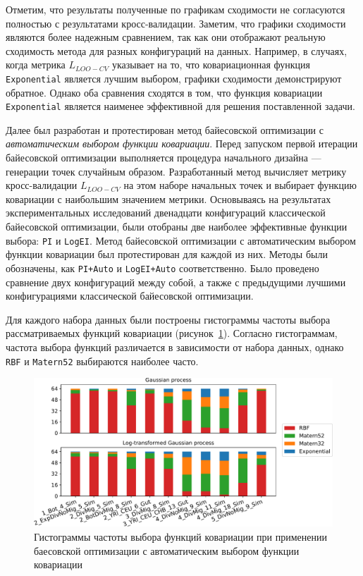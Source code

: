 Отметим, что результаты полученные по графикам сходимости не согласуются полностью с результатами кросс-валидации.
Заметим, что графики сходимости являются более надежным сравнением, так как они отображают реальную сходимость метода для разных конфигураций на данных.
Например, в случаях, когда метрика $L_{LOO-CV}$ указывает на то, что ковариационная функция \texttt{Exponential} является лучшим выбором, графики сходимости демонстрируют обратное.
Однако оба сравнения сходятся в том, что функция ковариации \texttt{Exponential} является наименее эффективной для решения поставленной задачи.

Далее был разработан и протестирован метод байесовской оптимизации с \emph{автоматическим выбором функции ковариации}.
Перед запуском первой итерации байесовской оптимизации выполняется процедура начального дизайна --- генерации точек случайным образом.
Разработанный метод вычисляет метрику кросс-валидации $L_{LOO-CV}$ на этом наборе начальных точек и выбирает функцию ковариации с наибольшим значением метрики.
Основываясь на результатах экспериментальных исследований двенадцати конфигураций классической байесовской оптимизации, были отобраны две наиболее эффективные функции выбора: \texttt{PI} и \texttt{LogEI}.
Метод байесовской оптимизации с автоматическим выбором функции ковариации был протестирован для каждой из них.
Методы были обозначены, как \texttt{PI+Auto} и \texttt{LogEI+Auto} соответственно.
Было проведено сравнение двух конфигураций между собой, а также с предыдущими лучшими конфигурациями классической байесовской оптимизации.

Для каждого набора данных были построены гистограммы частоты выбора рассматриваемых функций ковариации (рисунок~\ref{fig:part2:bo_hpo:kernel_sel_hists}).
Согласно гистограммам, частота выбора функций различается в зависимости от набора данных, однако \texttt{RBF} и \texttt{Matern52} выбираются наиболее часто.

\begin{figure}[ht]
    \centering
    \includegraphics[width=\linewidth]{images_experiments/bo_hpo/kernel_selection_hists.pdf}
    \caption{Гистограммы частоты выбора функций ковариации при применении баесовской оптимизации с автоматическим выбором функции ковариации}
    \label{fig:part2:bo_hpo:kernel_sel_hists}
\end{figure}

